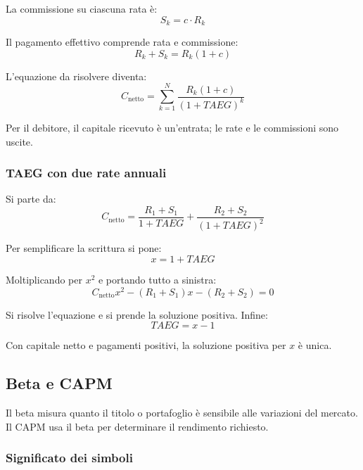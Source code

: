 \noindent
La commissione su ciascuna rata è:
\[
    S_k=c\cdot R_k
\]

\noindent
Il pagamento effettivo comprende rata e commissione:
\[
    R_k+S_k=R_k(1+c)
\]

\noindent
L'equazione da risolvere diventa:
\[
    C_{\text{netto}}
    =
    \sum_{k=1}^{N}\frac{R_k(1+c)}{(1+TAEG)^k}
\]

\noindent
Per il debitore, il capitale ricevuto è un'entrata;
le rate e le commissioni sono uscite.

\subsubsection*{TAEG con due rate annuali}

\noindent
Si parte da:
\[
    C_{\text{netto}}
    =
    \frac{R_1+S_1}{1+TAEG}
    +
    \frac{R_2+S_2}{(1+TAEG)^2}
\]

\noindent
Per semplificare la scrittura si pone:
\[
    x=1+TAEG
\]

\noindent
Moltiplicando per $x^2$ e portando tutto a sinistra:
\[
    C_{\text{netto}}x^2
    -(R_1+S_1)x
    -(R_2+S_2)
    =0
\]

\noindent
Si risolve l'equazione e si prende la soluzione positiva.
Infine:
\[
    TAEG=x-1
\]

\noindent
Con capitale netto e pagamenti positivi,
la soluzione positiva per $x$ è unica.

\subsection{Beta e CAPM}

\noindent
Il beta misura quanto il titolo o portafoglio
è sensibile alle variazioni del mercato.
Il CAPM usa il beta per determinare il rendimento richiesto.

\subsubsection*{Significato dei simboli}

